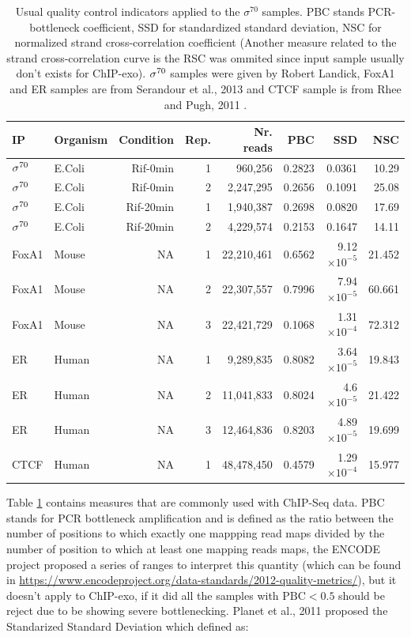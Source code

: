 \documentclass[11pt]{article}\usepackage[]{graphicx}\usepackage[]{color}
\begin{document}
\begin{table}[h]
  \centering
  \caption{Usual quality control indicators applied to the $\sigma^{70}$ samples. PBC stands PCR-bottleneck coefficient, SSD for standardized standard deviation, NSC for normalized strand cross-correlation coefficient (Another measure related to the strand cross-correlation curve is the RSC was ommited since input sample usually don't exists for ChIP-exo). $\sigma^{70}$ samples were given by Robert Landick, FoxA1 and ER samples are from Serandour et al., 2013 \cite{exoillumina} and CTCF sample is from Rhee and Pugh, 2011 \cite{exo1}.}

\begin{tabular}{l|l|r|r|r|r|r|r}
\hline\hline
IP & Organism  &Condition & Rep. & Nr. reads & PBC & SSD &  NSC  \\
\hline\hline
$\sigma^{70}$ & E.Coli & Rif-0min & 1 & 960,256 & 0.2823 & 0.0361 &  10.29 \\
\hline
$\sigma^{70}$ &  E.Coli & Rif-0min & 2 & 2,247,295 & 0.2656 & 0.1091  &  25.08  \\
\hline
$\sigma^{70}$ &  E.Coli & Rif-20min & 1 & 1,940,387 & 0.2698 & 0.0820  & 17.69  \\
\hline
$\sigma^{70}$ &  E.Coli & Rif-20min & 2 & 4,229,574 & 0.2153 & 0.1647  &  14.11 \\
\hline
FoxA1 &  Mouse &  NA & 1 & 22,210,461 & 0.6562 & 9.12 $\times 10^{-5}$ & 21.452 \\
\hline
FoxA1 &  Mouse &  NA & 2 & 22,307,557 & 0.7996 & 7.94 $\times 10^{-5}$ & 60.661 \\
\hline
FoxA1 &  Mouse &  NA & 3 & 22,421,729 & 0.1068 & 1.31 $\times 10^{-4}$ & 72.312 \\
\hline
ER & Human & NA & 1 & 9,289,835 & 0.8082 & 3.64 $\times 10^{-5}$ & 19.843 \\
\hline
ER & Human & NA & 2 & 11,041,833 & 0.8024 & 4.6 $\times 10^{-5}$ & 21.422 \\
\hline
ER & Human & NA & 3 & 12,464,836 & 0.8203 & 4.89 $\times 10^{-5}$ & 19.699 \\
\hline
CTCF & Human & NA & 1 &   48,478,450 & 0.4579 & 1.29 $\times 10^{-4}$ & 15.977 \\
\hline
\end{tabular}  
  \label{tab:qcbase}
\end{table}

Table \ref{tab:qcbase} contains measures that are commonly used with
ChIP-Seq data. PBC stands for PCR bottleneck amplification and is
defined as the ratio between the number of positions to which exactly
one mappping read maps divided by the number of position to which at
least one mapping reads maps, the ENCODE project proposed a series of
ranges to interpret this quantity (which can be found in
\url{https://www.encodeproject.org/data-standards/2012-quality-metrics/}),
but it doesn't apply to ChIP-exo, if it did all the samples with
$\mbox{PBC} < 0.5$ should be reject due to be showing severe
bottlenecking. Planet et al., 2011 proposed the Standarized Standard
Deviation which defined as:
\end{document}
